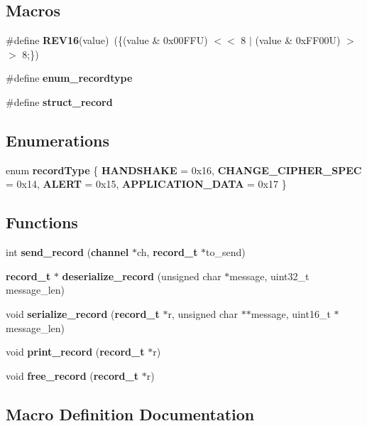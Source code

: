 \subsection*{Macros}
\begin{DoxyCompactItemize}
\item 
\#define {\bf R\+E\+V16}(value)~(\{(value \& 0x00\+F\+F\+U) $<$$<$ 8 $\vert$ (value \& 0x\+F\+F00\+U) $>$$>$ 8;\})
\item 
\#define {\bf enum\+\_\+recordtype}
\item 
\#define {\bf struct\+\_\+record}
\end{DoxyCompactItemize}
\subsection*{Enumerations}
\begin{DoxyCompactItemize}
\item 
enum {\bf record\+Type} \{ {\bf H\+A\+N\+D\+S\+H\+A\+KE} = 0x16, 
{\bf C\+H\+A\+N\+G\+E\+\_\+\+C\+I\+P\+H\+E\+R\+\_\+\+S\+P\+EC} = 0x14, 
{\bf A\+L\+E\+RT} = 0x15, 
{\bf A\+P\+P\+L\+I\+C\+A\+T\+I\+O\+N\+\_\+\+D\+A\+TA} = 0x17
 \}
\end{DoxyCompactItemize}
\subsection*{Functions}
\begin{DoxyCompactItemize}
\item 
int {\bf send\+\_\+record} ({\bf channel} $\ast$ch, {\bf record\+\_\+t} $\ast$to\+\_\+send)
\item 
{\bf record\+\_\+t} $\ast$ {\bf deserialize\+\_\+record} (unsigned char $\ast$message, uint32\+\_\+t message\+\_\+len)
\item 
void {\bf serialize\+\_\+record} ({\bf record\+\_\+t} $\ast$r, unsigned char $\ast$$\ast$message, uint16\+\_\+t $\ast$message\+\_\+len)
\item 
void {\bf print\+\_\+record} ({\bf record\+\_\+t} $\ast$r)
\item 
void {\bf free\+\_\+record} ({\bf record\+\_\+t} $\ast$r)
\end{DoxyCompactItemize}


\subsection{Macro Definition Documentation}
